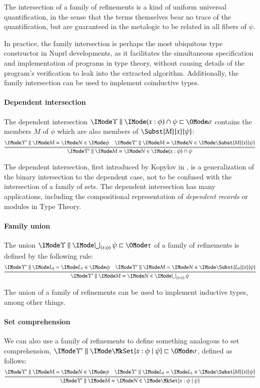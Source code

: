 \documentclass[11pt]{article}
\theoremstyle{definition}
\theoremstyle{notation}
\theoremstyle{remark}
\numberwithin{equation}{section}
\begin{document}
The intersection of a family of refinements is a kind of uniform universal
quantification, in the sense that the terms themselves bear no trace of the
quantification, but are guaranteed in the metalogic to be related in all fibers
of $\psi$.

In practice, the family intersection is perhaps the most ubiquitous type
constructor in Nuprl developments, as it facilitates the simultaneous
specification and implementation of programs in type theory, without causing
details of the program's verification to leak into the extracted algorithm.
Additionally, the family intersection can be used to implement coinductive
types.

\paragraph{Dependent intersection}
The dependent intersection $\Refines{\Upsilon}{(x:\phi)\cap\psi}{\sigma}$
contains the members $M$ of $\phi$ which are also members of
$\Subst{M}{x}{\psi}$:
\[
  \infer={
    \RMemEq{\Upsilon'}{M}{N}{
      (x:\phi)\cap\psi
    }
  }{
    \RMemEq{\Upsilon'}{M}{N}{\phi} &
    \RMemEq{\Upsilon'}{M}{N}{
      \Subst{M}{x}{\psi}
    }
  }
\]

The dependent intersection, first introduced by Kopylov in \cite{kopylov:2000},
is a generalization of the binary intersection to the dependent case, not to
be confused with the intersection of a family of sets. The dependent
intersection has many applications, including the compositional representation
of \emph{dependent records} or modules in Type Theory.

\paragraph{Family union}
The union $\Refines{\Upsilon}{\bigcup_{(x:\phi)}\psi}{\tau}$ of a family of
refinements is defined by the following rule:
\[
  \infer={
    \RMemEq{\Upsilon'}{M}{N}{
      \bigcup_{(x:\phi)}\psi
    }
  }{
    \RMemEq{\Upsilon'}{L_0}{L_1}{\phi} &
    \RMemEq{\Upsilon'}{M}{N}{
      \Subst{L_0}{x}{\psi}
    }
  }
\]

The union of a family of refinements can be used to implement inductive types,
among other things.

\paragraph{Set comprehension}

We can also use a family of refinements to define something analogous to set
comprehension, $\Refines{\Upsilon'}{\MkSet{x:\phi\mid\psi}}{\sigma}$, defined
as follows:
\[
  \infer={
    \RMemEq{\Upsilon'}{M}{N}{
      \MkSet{x:\phi\mid\psi}
    }
  }{
    \RMemEq{\Upsilon'}{M}{N}{\phi} &
    \RMemEq{\Upsilon'}{L_0}{L_1}{
      \Subst{M}{x}{\psi}
    }
  }
\]
\end{document}
